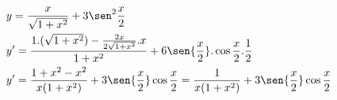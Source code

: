 \begin{ex}
\begin{align}
&y=\frac{x}{\sqrt{1+x^2}}+3\sen^2{\frac{x}{2}}\nonumber\\
&y'=\frac{1.(\sqrt{1+x^2})-\frac{2x}{2\sqrt{1+x^2}}.x}{1+x^2}+6\sen{\frac{x}{2}}.\cos{\frac{x}{2}}.\frac{1}{2}\nonumber\\
&y'=\frac{1+x^2-x^2}{x(1+x^2)}+3\sen{\frac{x}{2}}\cos{\frac{x}{2}}=\frac{1}{x(1+x^2)}+3\sen{\frac{x}{2}}\cos{\frac{x}{2}}\nonumber
\end{align}
\end{ex}